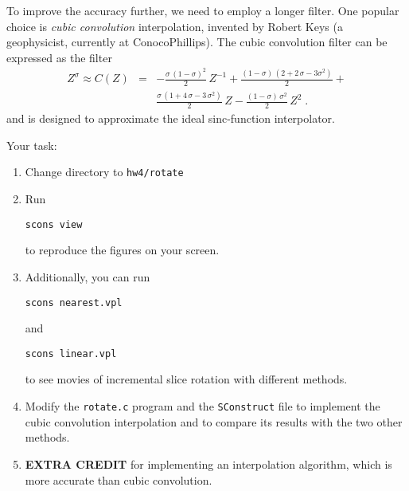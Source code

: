 To improve the accuracy further, we need to employ a longer
filter. One popular choice is \emph{cubic convolution} interpolation,
invented by Robert Keys (a geophysicist, currently at ConocoPhillips).
The cubic convolution filter can be expressed as the
filter \cite[]{keys}
\begin{eqnarray}
\nonumber
Z^{\sigma} \approx C(Z) & = & -\frac{\sigma\,(1-\sigma)^2}{2}\,Z^{-1} + 
\frac{(1-\sigma)\,(2 + 2\,\sigma - 3 \sigma^2)}{2} + \\
&  & \frac{\sigma\,(1 + 4\,\sigma - 3\,\sigma^2)}{2}\,Z - \frac{(1-\sigma)\,\sigma^2}{2}\,Z^2\;.
\label{eq:cubic}
\end{eqnarray}
and is designed to approximate the ideal sinc-function interpolator.


\lstset{language=c,numbers=left,numberstyle=\tiny,showstringspaces=false}


\lstset{language=python,numbers=left,numberstyle=\tiny,showstringspaces=false}


Your task:
\begin{enumerate}
\item Change directory to \texttt{hw4/rotate}
\item Run 
\begin{verbatim}
scons view
\end{verbatim}
to reproduce the figures on your screen.
\item Additionally, you can run
\begin{verbatim}
scons nearest.vpl
\end{verbatim}
and
\begin{verbatim}
scons linear.vpl
\end{verbatim}
to see movies of incremental slice rotation with different methods.
\item Modify the \texttt{rotate.c} program and the \texttt{SConstruct} file to implement 
the cubic convolution interpolation and to compare 
its results with the two other methods.
\item \textbf{EXTRA CREDIT} for implementing an interpolation algorithm, which 
is more accurate than cubic convolution.
\end{enumerate}


